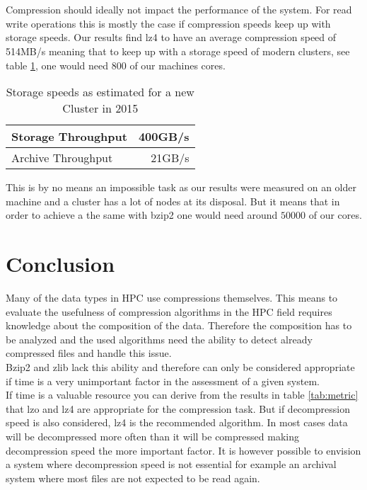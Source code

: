 \documentclass[
	12pt,
	a4paper,
	BCOR10mm,
	DIV14,
	listof=totoc,
	bibliography=totoc,
	headsepline
]{scrreprt}
\begin{document}
\\ \\
\newpage
Compression should ideally not impact the performance of the system.
For read write operations this is mostly the case if compression speeds keep up with storage speeds.
Our results find lz4 to have an average compression speed of 514MB/s meaning that to keep up with a storage speed of modern clusters, see table \ref{tab:storage_speeds}, one would need 800 of our machines cores.
\begin{table}[h]
\begin{center}
\begin{tabular}{|l|r|}
    \hline
    Storage Throughput & 400GB/s \\
    \hline
    Archive Throughput &  21GB/s \\
    \hline
\end{tabular}
\caption{Storage speeds as estimated for a new Cluster in 2015 \cite{ExaStoSy}}
\label{tab:storage_speeds}
\end{center}
\end{table}
\FloatBarrier

This is by no means an impossible task as our results were measured on an older machine and a cluster has a lot of nodes at its disposal. But it means that in order to achieve a the same with bzip2 one would need around $50000$ of our cores.
\\




\chapter{Conclusion}
\label{Conclusion}
Many of the data types in HPC use compressions themselves.
This means to evaluate the usefulness of compression algorithms in the HPC field requires knowledge about the composition of the data.
Therefore the composition has to be analyzed and the used algorithms need the ability to detect already compressed files and handle this issue.
\\
Bzip2 and zlib lack this ability and therefore can only be considered appropriate if time is a very unimportant factor in the assessment of a given system.
\\
If time is a valuable resource you can derive from the results in table \ref{tab:metric} that lzo and lz4 are appropriate for the compression task.
But if decompression speed is also considered, lz4 is the recommended algorithm.
In most cases data will be decompressed more often than it will be compressed making decompression speed the more important factor.
It is however possible to envision a system where decompression speed is not essential for example an archival system where most files are not expected to be read again.
\end{document}
